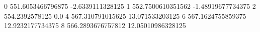 0 551.6053466796875 -2.6339111328125
1 552.7500610351562 -1.48919677734375
2 554.2392578125 0.0
4 567.310791015625 13.071533203125
6 567.1624755859375 12.9232177734375
8 566.2893676757812 12.05010986328125
